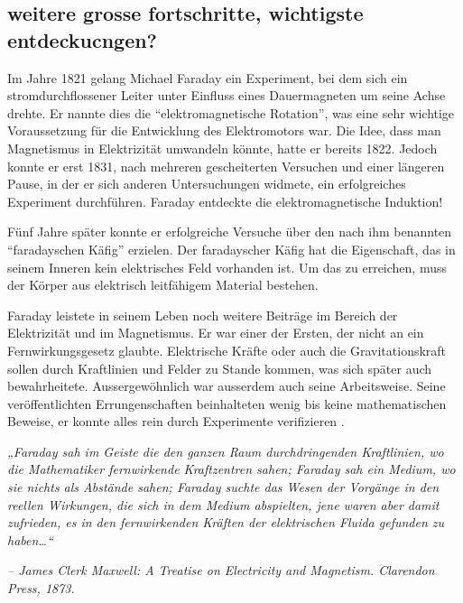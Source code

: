 \subsection{weitere grosse fortschritte, wichtigste entdeckucngen?}

Im Jahre 1821 gelang Michael Faraday ein Experiment, bei dem sich ein stromdurchflossener Leiter unter Einfluss eines Dauermagneten um seine Achse drehte.
Er nannte dies die ``elektromagnetische Rotation'', was eine sehr wichtige Voraussetzung für die Entwicklung des Elektromotors war.
Die Idee, dass man Magnetismus in Elektrizität umwandeln könnte, hatte er bereits 1822.
Jedoch konnte er erst 1831, nach mehreren gescheiterten Versuchen und einer längeren Pause, in der er sich anderen Untersuchungen widmete, ein erfolgreiches Experiment durchführen.
Faraday entdeckte die elektromagnetische Induktion!

Fünf Jahre später konnte er erfolgreiche Versuche über den nach ihm benannten ``faradayschen Käfig'' erzielen.
Der faradayscher Käfig hat die Eigenschaft, das in seinem Inneren kein elektrisches Feld vorhanden ist.
Um das zu erreichen, muss der Körper aus elektrisch leitfähigem Material bestehen.

Faraday leistete in seinem Leben noch weitere Beiträge im Bereich der Elektrizität und im Magnetismus. 
Er war einer der Ersten, der nicht an ein Fernwirkungsgesetz glaubte.
Elektrische Kräfte oder auch die Gravitationskraft sollen durch Kraftlinien und Felder zu Stande kommen, was sich später auch bewahrheitete.
Aussergewöhnlich war ausserdem auch seine Arbeitsweise.
Seine veröffentlichten Errungenschaften beinhalteten wenig bis keine mathematischen Beweise, er konnte alles rein durch Experimente verifizieren \cite{maxwell:Michael_Faraday}.

\begin{flushleft}
\emph{„Faraday sah im Geiste die den ganzen Raum durchdringenden Kraftlinien, wo die Mathematiker fernwirkende Kraftzentren sahen; Faraday sah ein Medium, wo sie nichts als Abstände sahen; Faraday suchte das Wesen der Vorgänge in den reellen Wirkungen, die sich in dem Medium abspielten, jene waren aber damit zufrieden, es in den fernwirkenden Kräften der elektrischen Fluida gefunden zu haben…“}

\emph{– James Clerk Maxwell: A Treatise on Electricity and Magnetism. Clarendon Press, 1873.}
\end{flushleft}

